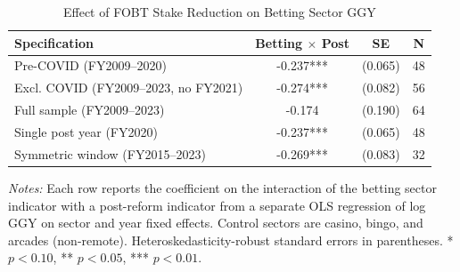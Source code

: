 \begin{table}[H]
\centering
\caption{Effect of FOBT Stake Reduction on Betting Sector GGY}
\begin{threeparttable}
\begin{tabular}{lccc}
\toprule
Specification & Betting $\times$ Post & SE & N \\
\midrule
Pre-COVID (FY2009--2020) & -0.237*** & (0.065) & 48 \\
Excl. COVID (FY2009--2023, no FY2021) & -0.274*** & (0.082) & 56 \\
Full sample (FY2009--2023) & -0.174 & (0.190) & 64 \\
Single post year (FY2020) & -0.237*** & (0.065) & 48 \\
Symmetric window (FY2015--2023) & -0.269*** & (0.083) & 32 \\
\bottomrule
\end{tabular}
\begin{tablenotes}[flushleft]
\small
\item \textit{Notes:} Each row reports the coefficient on the interaction of the betting sector indicator with a post-reform indicator from a separate OLS regression of log GGY on sector and year fixed effects. Control sectors are casino, bingo, and arcades (non-remote). Heteroskedasticity-robust standard errors in parentheses. * $p<0.10$, ** $p<0.05$, *** $p<0.01$.
\end{tablenotes}
\end{threeparttable}
\label{tab:main}
\end{table}


